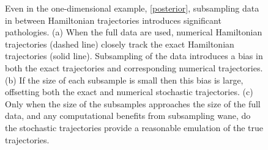 \documentclass{article}
\begin{document}
\begin{figure}
\centering
{}
\caption{Even in the one-dimensional example, \eqref{posterior}, subsampling
data in between Hamiltonian trajectories introduces significant pathologies.
(a) When the full data are used, numerical Hamiltonian trajectories (dashed line) 
closely track the exact Hamiltonian trajectories (solid line).  Subsampling of the
data introduces a bias in both the exact trajectories and corresponding
numerical trajectories.  (b) If the size of each subsample is small then this bias 
is large, offsetting both the exact and numerical stochastic trajectories. 
(c) Only when the size of the subsamples approaches the size of the full data, 
and any computational benefits from subsampling wane, do the stochastic 
trajectories provide a reasonable emulation of the true trajectories.}
\label{fig:level_sets}
\end{figure}
\end{document}
